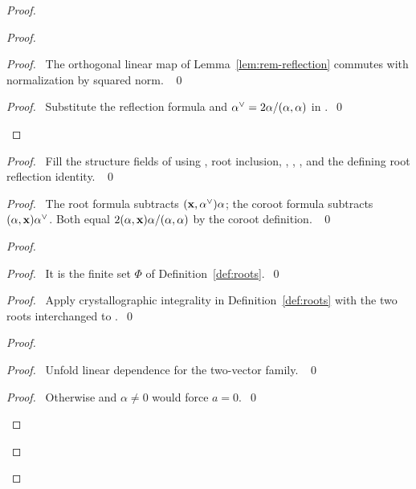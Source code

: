 \begin{proof}
\begin{proof}
\begin{proof}\pf\ The orthogonal linear map of
Lemma~\ref{lem:rem-reflection} commutes with normalization by squared norm. ~\qed\end{proof}
\qedstep
\begin{proof}\pf\ Substitute the reflection formula and
$\alpha^\vee=2\alpha/(\alpha,\alpha)$ in .~\qed\end{proof}
\end{proof}
\begin{proof}\pf\ Fill the structure fields of 
using , root inclusion, ,
, , 
and the defining root reflection identity. ~\qed\end{proof}
\begin{proof}\pf\ The root formula subtracts
$({\mathbf x},\alpha^\vee)\alpha$; the coroot formula subtracts
$(\alpha,{\mathbf x})\alpha^\vee$. Both equal
$2(\alpha,{\mathbf x})\alpha/(\alpha,\alpha)$ by the coroot definition. ~\qed\end{proof}
\begin{proof}
\begin{proof}\pf\ It is the finite set $\Phi$ of Definition~\ref{def:roots}.~\qed\end{proof}
\begin{proof}\pf\ Apply crystallographic integrality in
Definition~\ref{def:roots} with the two roots interchanged to
.~\qed\end{proof}
\begin{proof}
\begin{proof}\pf\ Unfold linear dependence for the two-vector family. ~\qed\end{proof}
\begin{proof}\pf\ Otherwise  and $\alpha\ne0$
would force $a=0$.~\qed\end{proof}

\end{proof}
\end{proof}
\end{proof}
